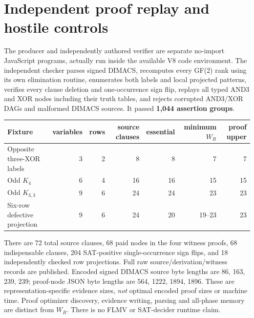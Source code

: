 \documentclass[11pt]{article}
\begin{document}
\section*{Independent proof replay and hostile controls}
The producer and independently authored verifier are separate no-import JavaScript programs, actually run inside the available V8 code environment. The independent checker parses signed DIMACS, recomputes every GF(2) rank using its own elimination routine, enumerates both labels and local projected patterns, verifies every clause deletion and one-occurrence sign flip, replays all typed AND3 and XOR nodes including their truth tables, and rejects corrupted AND3/XOR DAGs and malformed DIMACS sources. It passed \textbf{1,044 assertion groups}.

\begin{center}
\begin{tabular}{lrrrrrr}
\toprule
Fixture & variables & rows & source clauses & essential & minimum $W_R$ & proof upper\\
\midrule
Opposite three-XOR labels &3&2&8&8&7&7\\
Odd $K_4$ &6&4&16&16&15&15\\
Odd $K_{3,3}$ &9&6&24&24&23&23\\
Six-row defective projection &9&6&24&20&19--23&23\\
\bottomrule
\end{tabular}
\end{center}
There are 72 total source clauses, 68 paid nodes in the four witness proofs, 68 indispensable clauses, 204 SAT-positive single-occurrence sign flips, and 18 independently checked row projections. Full raw source/derivation/witness records are published. Encoded signed DIMACS source byte lengths are 86, 163, 239, 239; proof-node JSON byte lengths are 564, 1222, 1894, 1896. These are representation-specific evidence sizes, \emph{not} optimal encoded proof sizes or machine time. Proof optimizer discovery, evidence writing, parsing and all-phase memory are distinct from $W_R$. There is no FLMV or SAT-decider runtime claim.
\end{document}
